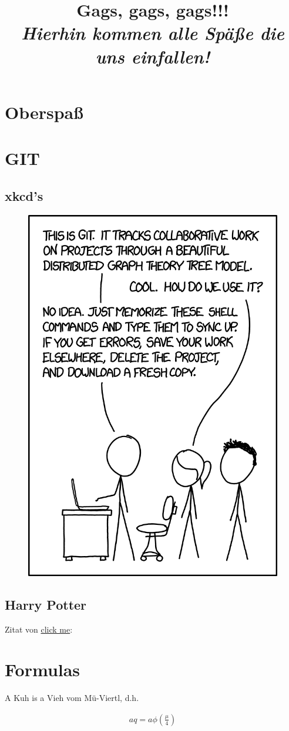 \documentclass{article}
\title
{
  Gags, gags, gags!!! \\
  \vspace{4pt}
  \normalsize
  \textit{Hierhin kommen alle Späße die uns einfallen!}
}
\author{}
\date{}
\begin{document}
\maketitle

\section{Oberspaß}

\section{GIT}

\subsection{xkcd's}

\begin{figure}[h!]
  \centering
  \includegraphics[width = 0.5 \linewidth]{images/git_2x.png}
\end{figure}

\subsection{Harry Potter}

Zitat von 
\href{https://www.hp-lexicon.org/quote/professor-snape-ugly-git/}{click me}: \\


\section{Formulas}

A Kuh is a Vieh vom Mü-Viertl, d.h.

\begin{align}
  aq = a \phi \left( \frac{\mu}{4} \right)
\end{align}
\end{document}
